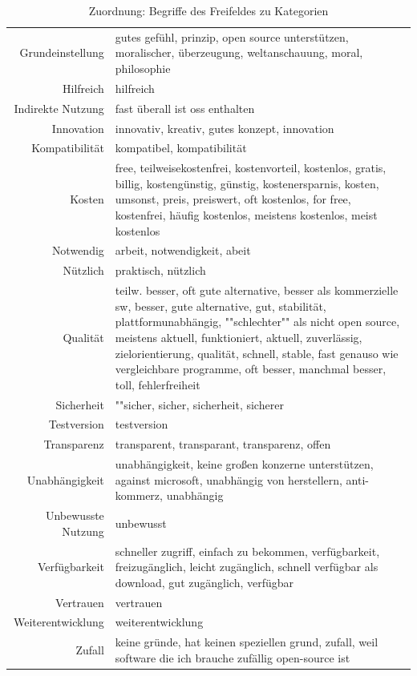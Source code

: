 \documentclass[a4paper]{article}
\begin{document}
\begin{table}[!htbp]
\begin{tabularx}{\textwidth}{rX}
                    Grundeinstellung & \tiny gutes gefühl, prinzip, open source unterstützen, moralischer, überzeugung, weltanschauung, moral, philosophie\\
                    Hilfreich & \tiny hilfreich\\
                    Indirekte Nutzung & \tiny fast überall ist oss enthalten\\
                    Innovation & \tiny innovativ, kreativ, gutes konzept, innovation\\
                    Kompatibilität & \tiny kompatibel, kompatibilität\\
                    Kosten & \tiny free, teilweisekostenfrei, kostenvorteil, kostenlos, gratis, billig, kostengünstig, günstig, kostenersparnis, kosten, umsonst, preis, preiswert, oft kostenlos, for free, kostenfrei, häufig kostenlos, meistens kostenlos, meist kostenlos\\
                    Notwendig & \tiny arbeit, notwendigkeit, abeit\\
                    Nützlich & \tiny praktisch, nützlich\\
                    Qualität & \tiny teilw. besser, oft gute alternative, besser als kommerzielle sw, besser, gute alternative, gut, stabilität, plattformunabhängig, ""schlechter"" als nicht open source, meistens aktuell, funktioniert, aktuell, zuverlässig, zielorientierung, qualität, schnell, stable, fast genauso wie vergleichbare programme, oft besser, manchmal besser, toll, fehlerfreiheit\\
                    Sicherheit & \tiny ""sicher, sicher, sicherheit, sicherer\\
                    Testversion & \tiny testversion\\
                    Transparenz & \tiny transparent, transparant, transparenz, offen\\
                    Unabhängigkeit & \tiny unabhängigkeit, keine großen konzerne unterstützen, against microsoft, unabhängig von herstellern, anti-kommerz, unabhängig\\
                    Unbewusste Nutzung & \tiny unbewusst\\
                    Verfügbarkeit & \tiny schneller zugriff, einfach zu bekommen, verfügbarkeit, freizugänglich, leicht zugänglich, schnell verfügbar als download, gut zugänglich, verfügbar\\
                    Vertrauen & \tiny vertrauen\\
                    Weiterentwicklung & \tiny weiterentwicklung\\
                    Zufall & \tiny keine gründe, hat keinen speziellen grund, zufall, weil software die ich brauche zufällig open-source ist\\
                \end{tabularx}
                \caption{Zuordnung: Begriffe des Freifeldes zu Kategorien}
                \label{table:categories}
            \end{table}
            
\end{document}
